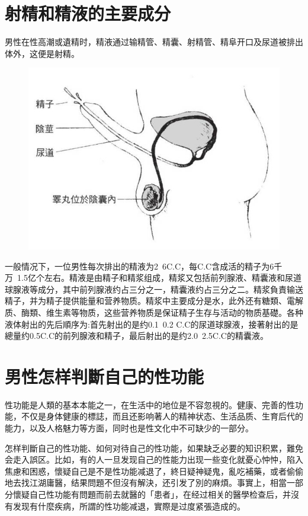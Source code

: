 \documentclass[12pt,UTF8]{ctexbook}
\begin{document}
\section{射精和精液的主要成分}

男性在性高潮或遺精时，精液通过输精管、精囊、射精管、精阜开口及尿道被排出体外，这便是射精。

\begin{figure}[htbp]
	\centering
	\includegraphics[width=0.7\linewidth]{5}
	\caption{}
\end{figure}

一般情况下，一位男性每次排出的精液为2~6C.C，每C.C含成活的精子为6千万~1.5亿个左右。精液是由精子和精浆组成，精浆又包括前列腺液、精囊液和尿道球腺液等成分，其中前列腺液约占三分之一，精囊液约占三分之二。精浆負責输送精子，并为精子提供能量和营养物质。精浆中主要成分是水，此外还有糖類、電解质、酶類、维生素等物质，这些营养物质是保证精子生存与活动的物质基礎。各种液体射出的先后順序为:首先射出的是约0.1~0.2 C.C的尿道球腺液，接著射出的是總量约0.5C.C的前列腺液和精子，最后射出的是约2.0~2.5C.C的精囊液。

\section{男性怎样判斷自己的性功能}

性功能是人類的基本本能之一，在生活中的地位是不容忽視的。健康、完善的性功能，不仅是身体健康的標誌，而且还影响著人的精神状态、生活品质、生育后代的能力，以及人格魅力等方面，同时也是性文化中不可缺少的一部分。

怎样判斷自己的性功能、如何对待自己的性功能，如果缺乏必要的知识积累，難免会走入誤区。比如，有的人一旦发现自己的性能力出现一些变化就憂心忡忡，陷入焦慮和困惑，懷疑自己是不是性功能减退了，終日疑神疑鬼，亂吃補藥，或者偷偷地去找江湖庸醫，结果問題不但沒有解決，还引发了別的麻煩。事實上，相當一部分懷疑自己性功能有問題而前去就醫的「患者」，在经过相关的醫學检查后，并沒有发现有什麼疾病，所謂的性功能减退，實際是过度紧張造成的。
\end{document}
